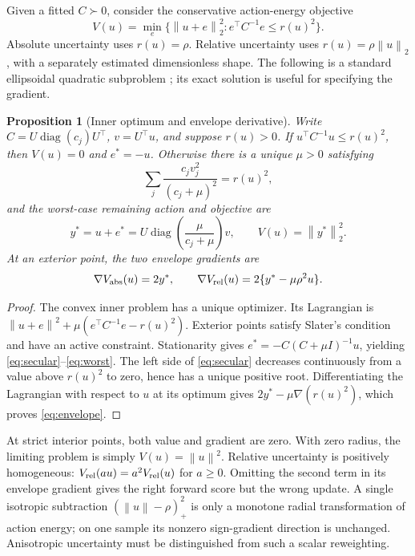 \documentclass[10pt,a4paper]{article}
\newtheorem{proposition}{Proposition}[section]
\newcommand{\norm}[1]{\left\|#1\right\|}
\begin{document}
Given a fitted $C\succ0$, consider the conservative action-energy objective
\begin{equation}\label{eq:ellipsoid}
 V(u)=\min_e\{\norm{u+e}_2^2:e^\top C^{-1}e\leq r(u)^2\}.
\end{equation}
Absolute uncertainty uses $r(u)=\rho$. Relative uncertainty uses
$r(u)=\rho\norm{u}_2$, with a separately estimated dimensionless shape.
The following is a standard ellipsoidal quadratic subproblem
\cite{more,elghaoui}; its exact solution is useful for specifying the gradient.

\begin{proposition}[Inner optimum and envelope derivative]\label{prop:ellipsoid}
Write $C=U\operatorname{diag}(c_j)U^\top$, $v=U^\top u$, and suppose $r(u)>0$.
If $u^\top C^{-1}u\leq r(u)^2$, then $V(u)=0$ and $e^*=-u$.
Otherwise there is a unique $\mu>0$ satisfying
\begin{equation}\label{eq:secular}
 \sum_j\frac{c_jv_j^2}{(c_j+\mu)^2}=r(u)^2,
\end{equation}
and the worst-case remaining action and objective are
\begin{equation}\label{eq:worst}
 y^*=u+e^*=U\operatorname{diag}\!\left(\frac{\mu}{c_j+\mu}\right)v,
 \qquad V(u)=\norm{y^*}_2^2.
\end{equation}
At an exterior point, the two envelope gradients are
\begin{equation}\label{eq:envelope}
 \nabla V_{\rm abs}(u)=2y^*,\qquad
 \nabla V_{\rm rel}(u)=2\{y^*-\mu\rho^2u\}.
\end{equation}
\end{proposition}
\begin{proof}
The convex inner problem has a unique optimizer. Its Lagrangian is
$\norm{u+e}^2+\mu(e^\top C^{-1}e-r(u)^2)$. Exterior points satisfy Slater's
condition and have an active constraint. Stationarity gives
$e^*=-C(C+\mu I)^{-1}u$, yielding \eqref{eq:secular}--\eqref{eq:worst}.
The left side of \eqref{eq:secular} decreases continuously from a value above
$r(u)^2$ to zero, hence has a unique positive root. Differentiating the
Lagrangian with respect to $u$ at its optimum gives
$2y^*-\mu\nabla(r(u)^2)$, which proves \eqref{eq:envelope}.
\end{proof}

At strict interior points, both value and gradient are zero. With zero radius,
the limiting problem is simply $V(u)=\norm{u}^2$. Relative uncertainty is
positively homogeneous: $V_{\rm rel}(a u)=a^2 V_{\rm rel}(u)$ for $a\geq0$.
Omitting the second term in its envelope gradient gives the right forward
score but the wrong update. A single isotropic subtraction
$(\norm{u}-\rho)_+^2$ is only a monotone radial transformation of action energy;
on one sample its nonzero sign-gradient direction is unchanged. Anisotropic
uncertainty must be distinguished from such a scalar reweighting.
\end{document}
